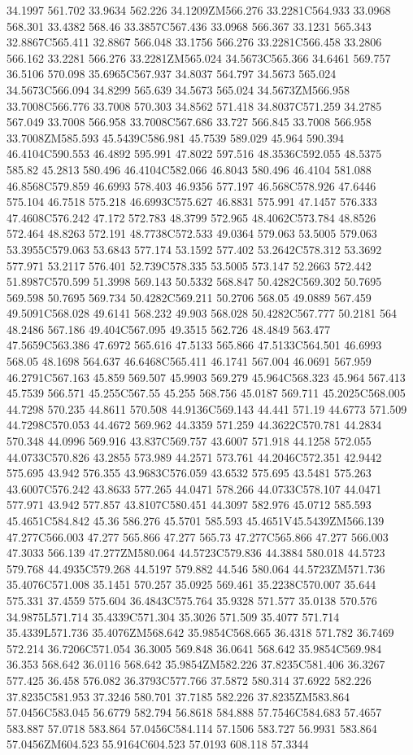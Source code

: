 34.1997 561.702 33.9634 562.226 34.1209ZM566.276 33.2281C564.933 33.0968 568.301 33.4382 568.46 33.3857C567.436 33.0968 566.367 33.1231 565.343 32.8867C565.411 32.8867 566.048 33.1756 566.276 33.2281C566.458 33.2806 566.162 33.2281 566.276 33.2281ZM565.024 34.5673C565.366 34.6461 569.757 36.5106 570.098 35.6965C567.937 34.8037 564.797 34.5673 565.024 34.5673C566.094 34.8299 565.639 34.5673 565.024 34.5673ZM566.958 33.7008C566.776 33.7008 570.303 34.8562 571.418 34.8037C571.259 34.2785 567.049 33.7008 566.958 33.7008C567.686 33.727 566.845 33.7008 566.958 33.7008ZM585.593 45.5439C586.981 45.7539 589.029 45.964 590.394 46.4104C590.553 46.4892 595.991 47.8022 597.516 48.3536C592.055 48.5375 585.82 45.2813 580.496 46.4104C582.066 46.8043 580.496 46.4104 581.088 46.8568C579.859 46.6993 578.403 46.9356 577.197 46.568C578.926 47.6446 575.104 46.7518 575.218 46.6993C575.627 46.8831 575.991 47.1457 576.333 47.4608C576.242 47.172 572.783 48.3799 572.965 48.4062C573.784 48.8526 572.464 48.8263 572.191 48.7738C572.533 49.0364 579.063 53.5005 579.063 53.3955C579.063 53.6843 577.174 53.1592 577.402 53.2642C578.312 53.3692 577.971 53.2117 576.401 52.739C578.335 53.5005 573.147 52.2663 572.442 51.8987C570.599 51.3998 569.143 50.5332 568.847 50.4282C569.302 50.7695 569.598 50.7695 569.734 50.4282C569.211 50.2706 568.05 49.0889 567.459 49.5091C568.028 49.6141 568.232 49.903 568.028 50.4282C567.777 50.2181 564 48.2486 567.186 49.404C567.095 49.3515 562.726 48.4849 563.477 47.5659C563.386 47.6972 565.616 47.5133 565.866 47.5133C564.501 46.6993 568.05 48.1698 564.637 46.6468C565.411 46.1741 567.004 46.0691 567.959 46.2791C567.163 45.859 569.507 45.9903 569.279 45.964C568.323 45.964 567.413 45.7539 566.571 45.255C567.55 45.255 568.756 45.0187 569.711 45.2025C568.005 44.7298 570.235 44.8611 570.508 44.9136C569.143 44.441 571.19 44.6773 571.509 44.7298C570.053 44.4672 569.962 44.3359 571.259 44.3622C570.781 44.2834 570.348 44.0996 569.916 43.837C569.757 43.6007 571.918 44.1258 572.055 44.0733C570.826 43.2855 573.989 44.2571 573.761 44.2046C572.351 42.9442 575.695 43.942 576.355 43.9683C576.059 43.6532 575.695 43.5481 575.263 43.6007C576.242 43.8633 577.265 44.0471 578.266 44.0733C578.107 44.0471 577.971 43.942 577.857 43.8107C580.451 44.3097 582.976 45.0712 585.593 45.4651C584.842 45.36 586.276 45.5701 585.593 45.4651V45.5439ZM566.139 47.277C566.003 47.277 565.866 47.277 565.73 47.277C565.866 47.277 566.003 47.3033 566.139 47.277ZM580.064 44.5723C579.836 44.3884 580.018 44.5723 579.768 44.4935C579.268 44.5197 579.882 44.546 580.064 44.5723ZM571.736 35.4076C571.008 35.1451 570.257 35.0925 569.461 35.2238C570.007 35.644 575.331 37.4559 575.604 36.4843C575.764 35.9328 571.577 35.0138 570.576 34.9875L571.714 35.4339C571.304 35.3026 571.509 35.4077 571.714 35.4339L571.736 35.4076ZM568.642 35.9854C568.665 36.4318 571.782 36.7469 572.214 36.7206C571.054 36.3005 569.848 36.0641 568.642 35.9854C569.984 36.353 568.642 36.0116 568.642 35.9854ZM582.226 37.8235C581.406 36.3267 577.425 36.458 576.082 36.3793C577.766 37.5872 580.314 37.6922 582.226 37.8235C581.953 37.3246 580.701 37.7185 582.226 37.8235ZM583.864 57.0456C583.045 56.6779 582.794 56.8618 584.888 57.7546C584.683 57.4657 583.887 57.0718 583.864 57.0456C584.114 57.1506 583.727 56.9931 583.864 57.0456ZM604.523 55.9164C604.523 57.0193 608.118 57.3344 